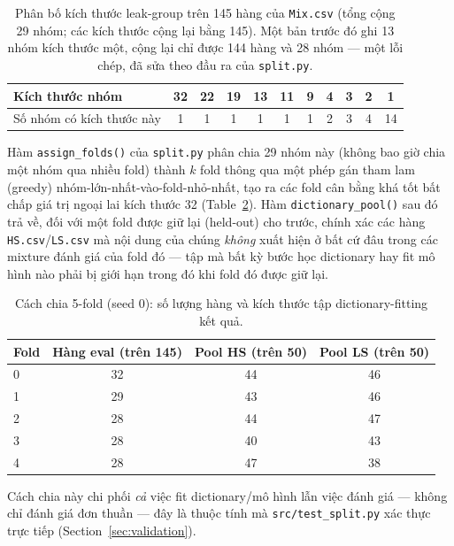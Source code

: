 \documentclass[11pt]{article}
\begin{document}
\begin{table}[H]
\centering
\caption{Phân bố kích thước leak-group trên 145 hàng của \texttt{Mix.csv} (tổng cộng 29 nhóm; các kích thước cộng lại bằng 145). Một bản trước đó ghi 13 nhóm kích thước một, cộng lại chỉ được 144 hàng và 28 nhóm --- một lỗi chép, đã sửa theo đầu ra của \texttt{split.py}.}
\label{tab:leakgroups}
\begin{tabular}{@{}lcccccccccc@{}}
\toprule
Kích thước nhóm & 32 & 22 & 19 & 13 & 11 & 9 & 4 & 3 & 2 & 1 \\
\midrule
Số nhóm có kích thước này & 1 & 1 & 1 & 1 & 1 & 1 & 2 & 3 & 4 & 14 \\
\bottomrule
\end{tabular}
\end{table}

Hàm \texttt{assign\_folds()} của \texttt{split.py} phân chia 29 nhóm này
(không bao giờ chia một nhóm qua nhiều fold) thành $k$ fold thông qua một
phép gán tham lam (greedy) nhóm-lớn-nhất-vào-fold-nhỏ-nhất, tạo ra các
fold cân bằng khá tốt bất chấp giá trị ngoại lai kích thước 32
(Table~\ref{tab:foldsizes}). Hàm \texttt{dictionary\_pool()} sau đó trả
về, đối với một fold được giữ lại (held-out) cho trước, chính xác các
hàng \texttt{HS.csv}/\texttt{LS.csv} mà nội dung của chúng \emph{không}
xuất hiện ở bất cứ đâu trong các mixture đánh giá của fold đó --- tập mà
bất kỳ bước học dictionary hay fit mô hình nào phải bị giới hạn trong đó
khi fold đó được giữ lại.

\begin{table}[H]
\centering
\caption{Cách chia 5-fold (seed 0): số lượng hàng và kích thước tập
dictionary-fitting kết quả.}
\label{tab:foldsizes}
\begin{tabular}{@{}lccc@{}}
\toprule
Fold & Hàng eval (trên 145) & Pool HS (trên 50) & Pool LS (trên 50) \\
\midrule
0 & 32 & 44 & 46 \\
1 & 29 & 43 & 46 \\
2 & 28 & 44 & 47 \\
3 & 28 & 40 & 43 \\
4 & 28 & 47 & 38 \\
\bottomrule
\end{tabular}
\end{table}

Cách chia này chi phối \emph{cả} việc fit dictionary/mô hình lẫn việc
đánh giá --- không chỉ đánh giá đơn thuần --- đây là thuộc tính mà
\texttt{src/test\_split.py} xác thực trực tiếp (Section~\ref{sec:validation}).
\end{document}
